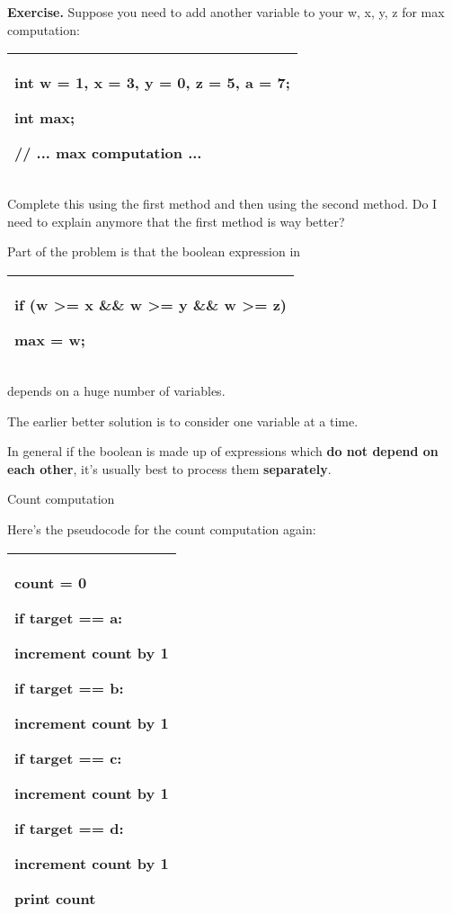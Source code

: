 \documentclass[
]{article}
\begin{document}
\textbf{Exercise.} Suppose you need to add another variable to your w,
x, y, z for max computation:

\begin{longtable}[]{@{}l@{}}
\toprule
\endhead
\begin{minipage}[t]{0.97\columnwidth}\raggedright
int w = 1, x = 3, y = 0, z = 5, a = 7;

int max;

// ... max computation ...\strut
\end{minipage}\tabularnewline
\bottomrule
\end{longtable}

Complete this using the first method and then using the second method.
Do I need to explain anymore that the first method is way better?

Part of the problem is that the boolean expression in

\begin{longtable}[]{@{}l@{}}
\toprule
\endhead
\begin{minipage}[t]{0.97\columnwidth}\raggedright
if (w \textgreater= x \&\& w \textgreater= y \&\& w \textgreater= z)

max = w; \strut
\end{minipage}\tabularnewline
\bottomrule
\end{longtable}

depends on a huge number of variables.

The earlier better solution is to consider one variable at a time.

In general if the boolean is made up of expressions which \textbf{do not
depend on each other}, it's usually best to process them
\textbf{separately}.

Count computation

Here's the pseudocode for the count computation again:

\begin{longtable}[]{@{}l@{}}
\toprule
\endhead
\begin{minipage}[t]{0.97\columnwidth}\raggedright
count = 0

if target == a:

increment count by 1

if target == b:

increment count by 1

if target == c:

increment count by 1

if target == d:

increment count by 1

print count\strut
\end{minipage}\tabularnewline
\bottomrule
\end{longtable}
\end{document}
